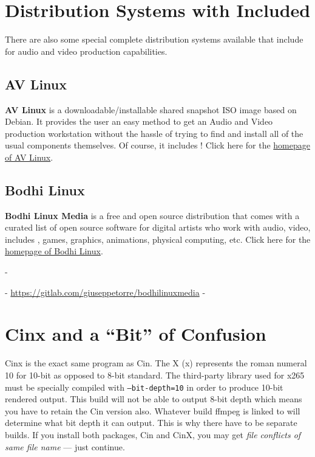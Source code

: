 \section{Distribution Systems with \CGG{} Included}%
\label{sec:distribution_systems_with_cinelerra_included}

There are also some special complete distribution systems available that include \CGG{} for audio and video production capabilities.

\subsection{AV Linux}
\label{sec:AV Linux}

\textbf{AV Linux} is a downloadable/installable shared snapshot
ISO image based on Debian.  It provides the user an easy method to
get an Audio and Video production workstation without the hassle
of trying to find and install all of the usual components
themselves.  Of course, it includes \CGG{}!
%
Click here for the
\href{http://www.bandshed.net/avlinux/}{homepage of AV Linux}.

\subsection{Bodhi Linux}
\label{sec:Bodhi Linux}

\textbf{Bodhi Linux Media} is a free and open source distribution that
comes with a curated list of open source software for digital
artists who work with audio, video, includes \CGG{}, games,
graphics, animations, physical computing, etc.
%
Click here for the
\href{https://gitlab.com/giuseppetorre/bodhilinuxmedia}{homepage of Bodhi Linux}.

-\begin{center}
-       {\small \url{https://gitlab.com/giuseppetorre/bodhilinuxmedia}}
-\end{center}   

\section{Cinx and a “Bit” of Confusion}%
\label{sec:cinx_and_a_bit_of_confusion}

Cinx is the exact same program as Cin.  
The X (x) represents the roman numeral 10 for 10-bit as opposed to 8-bit standard.  
The third-party library used for x265 must be specially compiled with \texttt{--bit-depth=10} in order to produce 10-bit rendered output.  
This build will not be able to output 8-bit depth which means you have to retain the Cin version also.  
Whatever build ffmpeg is linked to will determine what bit depth it can output.  
This is why there have to be separate builds.  
If you install both packages, Cin and CinX, you may get \textit{file conflicts of same file name} --- just continue.

